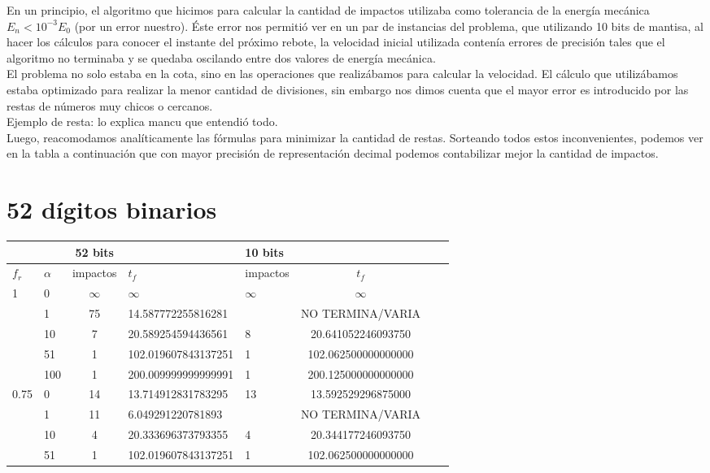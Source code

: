 \documentclass[10pt, a4paper,english,spanish]{article}
\begin{document}
En un principio, el algoritmo que hicimos para calcular la cantidad de impactos utilizaba como tolerancia de la energía mecánica $E_n < 10^{-3}E_0$ (por un error nuestro).
Éste error nos permitió ver en un par de instancias del problema, que utilizando 10 bits de mantisa, al hacer los cálculos para conocer el instante del próximo rebote, la velocidad inicial utilizada contenía errores de precisión tales que el algoritmo no terminaba y se quedaba oscilando entre dos valores de energía mecánica.\\

El problema no solo estaba en la cota, sino en las operaciones que realizábamos para calcular la velocidad. El cálculo que utilizábamos estaba optimizado para realizar la menor cantidad de divisiones, sin embargo nos dimos cuenta que el mayor error es introducido por las restas de números muy chicos o cercanos.\\

Ejemplo de resta: lo explica mancu que entendió todo.\\

Luego, reacomodamos analíticamente las fórmulas para minimizar la cantidad de restas.
Sorteando todos estos inconvenientes, podemos ver en la tabla a continuación que con mayor precisión de representación decimal podemos contabilizar mejor la cantidad de impactos.

\section{52 dígitos binarios}

\begin{center}
\begin{tabular}{|ll|cl|lc|c|c|}
\hline
 & & 52 bits &  & 10 bits &  \\ \hline
$f_r$ & $\alpha$ & impactos & $t_f$ & impactos & $t_f$ \\ \hline
1 & 0 & {$\infty$} & {$\infty$} & {$\infty$} & {$\infty$} \\
  & 1 & {75} & {14.587772255816281} & {} & {NO TERMINA/VARIA}\\
  & 10 & {7} & {20.589254594436561} & {8} & {20.641052246093750}\\
  & 51 & {1} & {102.019607843137251} & {1} & {102.062500000000000}\\
  & 100 & {1} & {200.009999999999991} & {1} & {200.125000000000000}\\ \hline
0.75 & 0 & {14} & {13.714912831783295} & {13} & {13.592529296875000}\\
     & 1 & {11} & {6.049291220781893} & {} & {NO TERMINA/VARIA}\\
     & 10 & {4} & {20.333696373793355} & {4} & {20.344177246093750}\\
     & 51 & {1} & {102.019607843137251} & {1} & {102.062500000000000}\\ \hline
\end{tabular}
\end{center}
\end{document}
